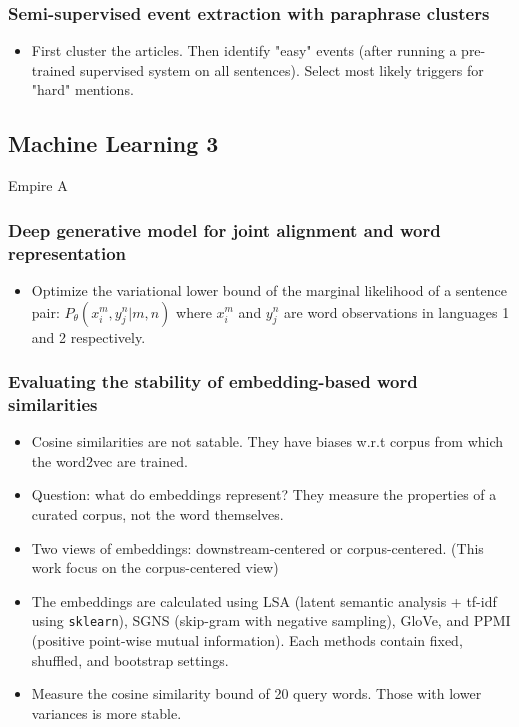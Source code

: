 \subsubsection{Semi-supervised event extraction with paraphrase clusters \cite{Ferguson2018Semi-Supervised}}
\begin{itemize}
	\item First cluster the articles. Then identify "easy" events (after running a pre-trained supervised system on all sentences). Select most likely triggers for "hard" mentions.
\end{itemize}




\subsection{Machine Learning 3}
Empire A
\subsubsection{Deep generative model for joint alignment and word representation \cite{Rios2018Deep}}
\begin{itemize}
	\item Optimize the variational lower bound of the marginal likelihood of a sentence pair: $P_\theta (x_i^m, y_j^n | m, n)$ where $x_i^m$ and $y_j^n$ are word observations in languages 1 and 2 respectively.
\end{itemize}


\subsubsection{Evaluating the stability of embedding-based word similarities}
\begin{itemize}
	\item Cosine similarities are not satable. They have biases w.r.t corpus from which the word2vec are trained.
	\item Question: what do embeddings represent? They measure the properties of a curated corpus, not the word themselves.
	\item Two views of embeddings: downstream-centered or corpus-centered. (This work focus on the corpus-centered view)
	\item The embeddings are calculated using LSA (latent semantic analysis + tf-idf using \texttt{sklearn}), SGNS (skip-gram with negative sampling), GloVe, and PPMI (positive point-wise mutual information). Each methods contain fixed, shuffled, and bootstrap settings.
	\item Measure the cosine similarity bound of 20 query words. Those with lower variances is more stable.
\end{itemize}

